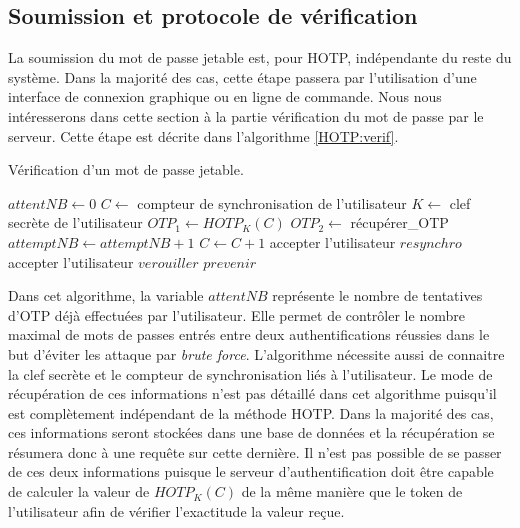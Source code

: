 \documentclass{../res/univ-projet}
\begin{document}
  \subsection{Soumission et protocole de vérification}
  La soumission du mot de passe jetable est, pour HOTP, indépendante du reste du système. Dans la majorité des cas, cette étape passera par l'utilisation d'une interface 
  de connexion graphique ou en ligne de commande. Nous nous intéresserons dans cette section à la partie vérification du mot de passe par le serveur. Cette étape est 
  décrite dans l'algorithme \ref{HOTP:verif}.  
  \begin{algorithm}
    \caption{Vérification d'un mot de passe jetable.}
    \label{HOTP:verif}
    
    \begin{algorithmic}
      \STATE $attentNB \leftarrow 0$
      \STATE $C \leftarrow$ compteur de synchronisation de l'utilisateur
      \STATE $K \leftarrow$ clef secrète de l'utilisateur
      \STATE $OTP_1 \leftarrow HOTP_K(C)$
        \STATE $OTP_2 \leftarrow$ récupérer\_OTP
        \STATE $attemptNB \leftarrow attemptNB + 1$
          \STATE $C \leftarrow C + 1$
          \STATE accepter l'utilisateur
        \ELSE
            \STATE $resynchro$
            \STATE accepter l'utilisateur
          \ENDIF
        \ENDIF
      \ENDWHILE
      \STATE $verouiller$
      \STATE $prevenir$
    \end{algorithmic}
  \end{algorithm}
  
  Dans cet algorithme, la variable $attentNB$ représente le nombre de tentatives d'OTP déjà effectuées par l'utilisateur. Elle permet de contrôler le nombre maximal de mots 
  de passes entrés entre deux authentifications réussies dans le but d'éviter les attaque par \emph{brute force}.
  L'algorithme nécessite aussi de connaitre la clef secrète et le compteur de synchronisation liés à l'utilisateur. Le mode de récupération de ces informations n'est pas 
  détaillé dans cet algorithme puisqu'il est complètement indépendant de la méthode HOTP. Dans la majorité des cas, ces informations seront stockées dans une base de 
  données et la récupération se résumera donc à une requête sur cette dernière. Il n'est pas possible de se passer de ces deux informations puisque le serveur 
  d'authentification doit être capable de calculer la valeur de $HOTP_K(C)$ de la même manière que le token de l'utilisateur afin de vérifier l'exactitude la valeur 
  reçue.
  
\end{document}
